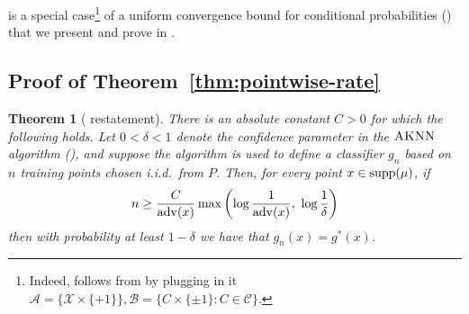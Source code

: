 \documentclass{article}
\def\X{{\mathcal X}}
\def\B{{\mathcal B}}
\def\supp{{\rm supp}}
\def\adv{{\rm adv}}
\newcommand{\cA}{\mathcal{A}}
\newcommand{\algname}{\textsc{AKNN}}
\newtheorem*{theorem*}{Theorem}
\newcommand{\comment}[3]{{\color{#1} {\bf #2 :} #3}}
\newcommand{\new}[1]{\color{red} #1}
\newcommand{\shay}[1]{\comment{purple}{Shay}{#1}}
\begin{document}
 is a special case\footnote{\new{Indeed, \Cref{lemma:bias} follows from  
by plugging in it $\cA = \{\X\times\{+1\}\}, \B = \{C\times\{\pm 1\} : C\in\mathcal{C}\}$.}} of a uniform convergence bound for conditional probabilities () 
that we present and prove in .


\subsection{Proof of Theorem~\ref{thm:pointwise-rate}}

\begin{theorem*}[ restatement] 
There is an absolute constant $C > 0$ for which the following holds.
Let $0 < \delta < 1$ denote the confidence parameter in the $\algname$ algorithm (),
and suppose the algorithm is used to define a classifier $g_n$ based on $n$ training points chosen i.i.d.\ from $P$. 
Then, for every point $x\in\supp(\mu)$, if
\[n \geq \frac{C}{\adv(x)} \max \left( \log \frac{1}{\adv(x)}, \ \log \frac{1}{\delta} \right)\]
then with probability at least $1-\delta$ we have that $g_n(x)=g^*(x)$.
\end{theorem*}
\end{document}

